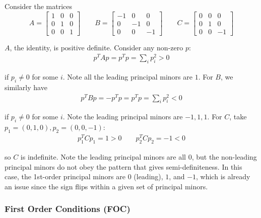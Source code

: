 \documentclass{article}
\begin{document}
\begin{example}
  Consider the matrices
  \[
    A = \left[\begin{matrix}
      1 & 0 & 0 \\
      0 & 1 & 0 \\
      0 & 0 & 1
    \end{matrix}\right]
    \quad\quad
    B = \left[\begin{matrix}
      - 1 & 0 & 0 \\
      0 & - 1 & 0 \\
      0 & 0 & - 1
    \end{matrix}\right]
    \quad\quad
    C = \left[\begin{matrix}
      0 & 0 & 0 \\
      0 & 1 & 0 \\
      0 & 0 & -1
    \end{matrix}\right]
  \]

  $A$, the identity, is positive definite. Consider any non-zero $p$:
  \begin{align*}
    p^T A p = p^T p = \sum_{i} p_i^2 > 0
  \end{align*}

  if $p_i \ne 0$ for some $i$. Note all the leading principal minors are $1$. For $B$, we similarly have
  \begin{align*}
    p^T B p = - p^T p = p^T p = \sum_{i} p_i^2 < 0
  \end{align*}

  if $p_i \ne 0$ for some $i$. Note the leading principal minors are $-1, 1, 1$. For $C$, take $p_1 = (0, 1, 0), p_2 = (0, 0, -1)$:
  \begin{align*}
    p_1^T C p_1 = 1 > 0
    \quad\quad
    p_2^T C p_2 = -1 < 0
  \end{align*}

  so $C$ is indefinite. Note the leading principal minors are all $0$, but the non-leading principal minors do not obey the pattern that gives semi-definiteness. In this case, the 1st-order principal minors are $0$ (leading), $1$, and $-1$, which is already an issue since the sign flips within a given set of principal minors.
\end{example}

\subsubsection{First Order Conditions (FOC)}
\label{ssub:first_order_conditions_foc_}
\end{document}
